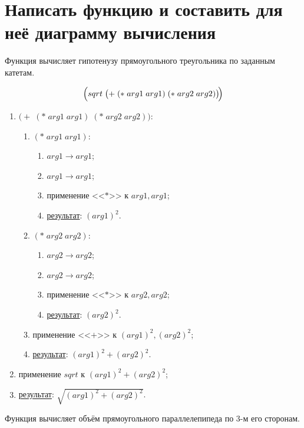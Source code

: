 \section{Написать функцию и составить для неё диаграмму вычисления}

\problem Функция вычисляет гипотенузу прямоугольного треугольника по заданным катетам.
\vfill

\vfill

\[
	\Bigl(sqrt\; \bigl(+\; (*\; arg1\; arg1)\; (*\; arg2\; arg2)\bigr)\!\Bigr)
\]
\vfill

\begin{enumerate}
	\item $\bigl(+\; (*\; arg1\; arg1)\; (*\; arg2\; arg2)\bigr)$:
	\begin{enumerate}
		\item $(*\; arg1\; arg1)$:
		\begin{enumerate}
			\item $arg1 \to arg1$;
			\item $arg1 \to arg1$;
			\item применение <<$*$>> к $arg1, arg1$;
			\item \underline{результат}: $(arg1)^2$.
		\end{enumerate}
		\item $(*\; arg2\; arg2)$:
		\begin{enumerate}
			\item $arg2 \to arg2$;
			\item $arg2 \to arg2$;
			\item применение <<$*$>> к $arg2, arg2$;
			\item \underline{результат}: $(arg2)^2$.
		\end{enumerate}
		\item применение <<$+$>> к $(arg1)^2, (arg2)^2$;
		\item \underline{результат}: $(arg1)^2 + (arg2)^2$.
	\end{enumerate}
	\item применение $sqrt$ к $(arg1)^2 + (arg2)^2$;
	\item \underline{результат}: $\sqrt{(arg1)^2 + (arg2)^2}$.
\end{enumerate}


\newpage
\problem Функция вычисляет объём прямоугольного параллелепипеда по 3-м его сторонам.


